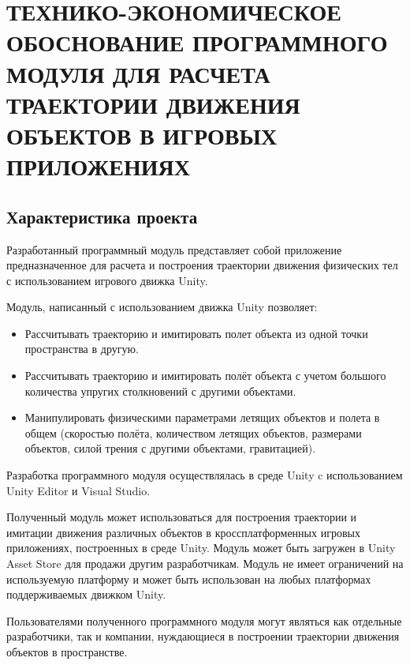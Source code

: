 \section{ТЕХНИКО-ЭКОНОМИЧЕСКОЕ ОБОСНОВАНИЕ ПРОГРАММНОГО МОДУЛЯ ДЛЯ РАСЧЕТА ТРАЕКТОРИИ ДВИЖЕНИЯ ОБЪЕКТОВ В ИГРОВЫХ ПРИЛОЖЕНИЯХ}

\subsection{Характеристика проекта}
Разработанный программный модуль представляет собой приложение предназначенное для расчета и построения траектории движения физических тел с использованием игрового движка Unity. 
 
Модуль, написанный с использованием движка Unity позволяет:
\begin{itemize}
	\item Рассчитывать траекторию и имитировать полет объекта из одной точки пространства в другую.
	\item Рассчитывать траекторию и имитировать полёт объекта с учетом большого количества упругих столкновений с другими объектами.
	\item Манипулировать физическими параметрами летящих объектов и полета в общем (скоростью полёта, количеством летящих объектов, размерами объектов, силой трения с другими объектами, гравитацией).
\end{itemize}

Разработка программного модуля осуществлялась в среде Unity c использованием Unity Editor и Visual Studio.

Полученный модуль может использоваться для построения траектории и имитации движения различных объектов в кроссплатформенных игровых приложениях, построенных в среде Unity. Модуль может быть загружен в Unity Asset Store для продажи другим разработчикам. Модуль не имеет ограничений на используемую платформу и может быть использован на любых платформах поддерживаемых движком Unity. 

Пользователями полученного программного модуля могут являться как отдельные разработчики, так и компании, нуждающиеся в построении траектории движения объектов в пространстве.


